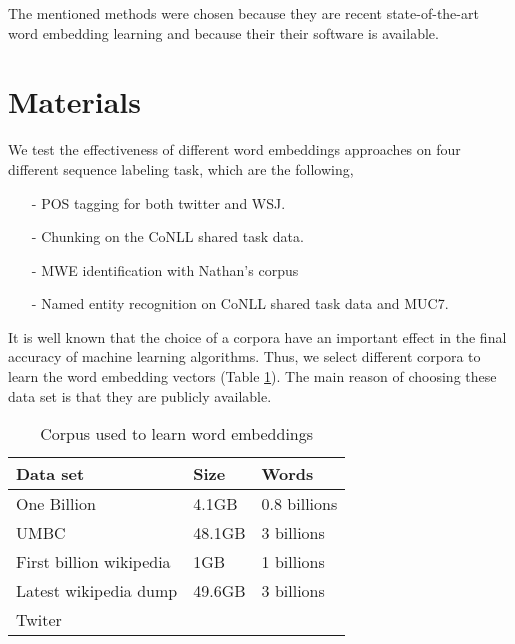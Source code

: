 \documentclass[11pt]{article}
\begin{document}
The mentioned methods were chosen because they are recent state-of-the-art word embedding learning and because their their software is available.



\section{Materials}
We test the effectiveness of different word embeddings approaches on four different sequence labeling task, which are the following, 

\begin{enumerate}
\item[-] POS tagging for both twitter and WSJ.
\item[-] Chunking on the CoNLL shared task data.
\item[-] MWE identification with Nathan’s corpus %
\item[-] Named entity recognition on CoNLL shared task data and MUC7.
\end{enumerate}



It is well known that the choice of a corpora have an important effect in the final accuracy of machine learning algorithms. 
Thus, we select different corpora to learn the word embedding vectors (Table \ref{corpus}).
The main reason of choosing these data set is that they are publicly available. 


\begin{table}[h]
\begin{center}
\begin{small}
\begin{tabular}{lll}
\hline
\textbf{Data set} & \textbf{Size} & \textbf{Words} \\ \hline
One Billion 	& 4.1GB & 0.8 billions  \\
UMBC 	& 48.1GB & 3 billions \\
First billion wikipedia & 1GB & 1 billions \\
Latest wikipedia dump & 49.6GB & 3 billions \\
Twiter & &  \\ \hline
\end{tabular}
\end{small}
\label{corpus}
\caption{Corpus used to learn word embeddings}
\end{center}
\end{table}
\end{document}
